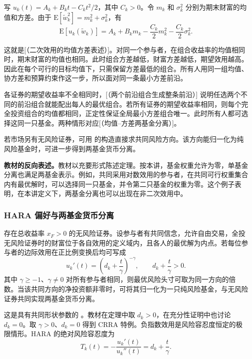 \begin{solution}[label-content={证明},blank-type=none]
写 $u_k(t)=A_k+B_kt-C_kt^2/2$，其中 $C_k>0$。令 $m_k$ 和 $\sigma_k^2$ 分别为期末财富的均值和方差。由于 $\mathrm E[\tilde w_k^2]=m_k^2+\sigma_k^2$，有
\[
 \mathrm E[u_k(\tilde w_k)]
 =A_k+B_km_k-\frac{C_k}{2}m_k^2-\frac{C_k}{2}\sigma_k^2.
\]

这就是[（二次效用的均值方差表述）]。对同一个参与者，在组合收益率的均值相同时，期末财富的均值也相同。此时组合方差越低，财富方差越低，期望效用越高。因此在每个可行的目标均值下，只需保留方差最低的组合。所有人用同一组均值、协方差和预算约束作这一步，所以面对同一条最小方差前沿。

各证券的期望收益率不全相同时，[（两个前沿组合生成整条前沿）] 说明任选两个不同的前沿组合就能配出每人的最优组合。若所有证券的期望收益率相同，则每个完全投资组合的均值都相同，正定性保证全局最小方差组合唯一。此时所有人都可选择这同一只基金。两种情形对应[（均值--方差两基金分离）]。
\end{solution}

若市场另有无风险证券，可用 的构造直接求共同风险方向。该方向能归一化为纯风险基金时，可进一步得到两基金货币分离。

\textbf{教材的反向表述。}教材以充要形式陈述定理。按本讲，基金权重允许为零，单基金分离也满足两基金表示。例如，共同采用对数效用的参与者，在共同可行权重集合内有最优解时，可以选择同一只基金，并令第二只基金的权重为零。这个例子表明，在本讲定义下，两基金分离也可以出现在非二次效用中。

\subsubsection{HARA 偏好与两基金货币分离}
\begin{tcolorbox}[knowledge]
 存在总收益率 $x_F>0$ 的无风险证券。设参与者有共同信念，允许自由交易，全投无风险证券时的财富位于各自效用的定义域内，且各人的最优解为内点。若每位参与者的边际效用在正比例变换后均可写成
\[
 u_k'(t)=\left(d_k+\frac{t}{\gamma}\right)^{-\gamma},
 \qquad d_k+\frac{t}{\gamma}>0.
\]
其中 $\gamma\ge-1$、$\gamma\ne0$ 对所有参与者相同，则最优风险头寸可取为同一方向的倍数。当该共同方向的净投资额非零时，可将其归一化为一只纯风险基金，与无风险证券共同实现两基金货币分离。
\end{tcolorbox}
这是具有共同形状参数的 。教材在定理中取 $d_k>0$，在充分性证明中也讨论 $d_k=0$。取 $\gamma>0$、$d_k=0$ 得到 CRRA 特例。负指数效用是风险容忍度恒定的极限情形。HARA 的绝对风险容忍度为
\[
 T_k(t)=-\frac{u_k'(t)}{u_k''(t)}=d_k+\frac{t}{\gamma}.
\]

